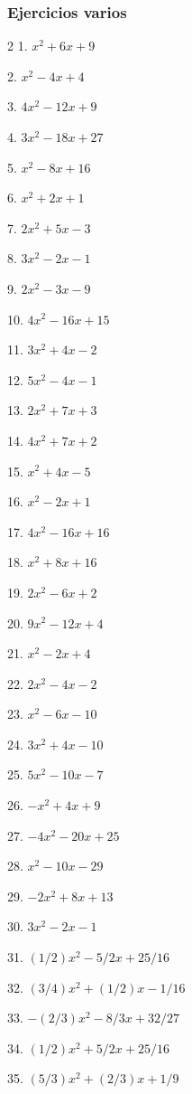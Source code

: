 \documentclass[12pt]{article}
\begin{document}
\subsubsection{Ejercicios varios}\label{ejercicios-varios}
\begin{multicols}{2}
1. $x^2 + 6x + 9$

2. $x^2 - 4x + 4$

3. $4x^2 - 12x + 9$

4. $3x^2 - 18x + 27$

5. $x^2 - 8x + 16$

6. $x^2 + 2x + 1$

7. $2x^2 + 5x - 3$

8. $3x^2 - 2x - 1$

9. $2x^2 - 3x - 9$

10. $4x^2 - 16x + 15$

11. $3x^2 + 4x - 2$

12. $5x^2 - 4x - 1$

13. $2x^2 + 7x + 3$

14. $4x^2 + 7x + 2$

15. $x^2 + 4x - 5$

16. $x^2 - 2x + 1$

17. $4x^2 - 16x + 16$

18. $x^2 + 8x + 16$

19. $2x^2 - 6x + 2$

20. $9x^2 - 12x + 4$

21. $x^2 - 2x + 4$

22. $2x^2 - 4x - 2$

23. $x^2 - 6x - 10$

24. $3x^2 + 4x - 10$

25. $5x^2 - 10x - 7$

26. $-x^2 + 4x + 9$

27. $-4x^2 - 20x + 25$

28. $x^2 - 10x - 29$

29. $-2x^2 + 8x + 13$

30. $3x^2 - 2x - 1$

31. $(1/2)x^2 - 5/2x + 25/16$

32. $(3/4)x^2 + (1/2)x - 1/16$

33. $-(2/3)x^2 - 8/3x + 32/27$

34. $(1/2)x^2 + 5/2x + 25/16$

35. $(5/3)x^2 + (2/3)x + 1/9$
\end{multicols}
\end{document}
